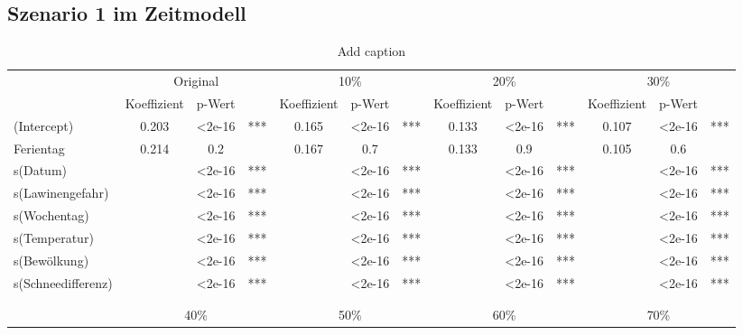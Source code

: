 \documentclass[12pt]{scrreprt}
\begin{document}
\subsection{Szenario 1 im Zeitmodell}
\begin{table}[htbp]
	\centering
	\caption{Add caption}
	\begin{adjustbox}{max width=\textwidth}
	\begin{tabular}{l|ccc|ccc|ccc|ccc|}
		\multicolumn{1}{r}{} & \multicolumn{3}{c}{Original} & \multicolumn{3}{c}{10\%} & \multicolumn{3}{c}{20\%} & \multicolumn{3}{c}{30\%} \\
		& Koeffizient & p-Wert &       & Koeffizient & p-Wert &       & Koeffizient & p-Wert &       & Koeffizient & p-Wert & \multicolumn{1}{c}{} \\
		\cmidrule{2-13}    (Intercept) & 0.203 & <2e-16 & ***   & 0.165 & <2e-16 & ***   & 0.133 & <2e-16 & ***   & 0.107 & <2e-16 & *** \\
		Ferientag & 0.214 & 0.2   &       & 0.167 & 0.7   &       & 0.133 & 0.9   &       & 0.105 & 0.6   &   \\
		s(Datum) &       & <2e-16 & ***   &       & <2e-16 & ***   &       & <2e-16 & ***   &       & <2e-16 & *** \\
		s(Lawinengefahr) &       & <2e-16 & ***   &       & <2e-16 & ***   &       & <2e-16 & ***   &       & <2e-16 & *** \\
		s(Wochentag) &       & <2e-16 & ***   &       & <2e-16 & ***   &       & <2e-16 & ***   &       & <2e-16 & *** \\
		s(Temperatur) &       & <2e-16 & ***   &       & <2e-16 & ***   &       & <2e-16 & ***   &       & <2e-16 & *** \\
		s(Bewölkung) &       & <2e-16 & ***   &       & <2e-16 & ***   &       & <2e-16 & ***   &       & <2e-16 & *** \\
		s(Schneedifferenz) &       & <2e-16 & ***   &       & <2e-16 & ***   &       & <2e-16 & ***   &       & <2e-16 & *** \\
		\cmidrule{2-13}    \multicolumn{1}{r}{} &       &       & \multicolumn{1}{c}{} &       &       & \multicolumn{1}{c}{} &       &       & \multicolumn{1}{c}{} &       &       & \multicolumn{1}{c}{} \\
		\multicolumn{1}{r}{} &       &       & \multicolumn{1}{c}{} &       &       & \multicolumn{1}{c}{} &       &       & \multicolumn{1}{c}{} &       &       & \multicolumn{1}{c}{} \\
		\multicolumn{1}{r}{} & \multicolumn{3}{c}{40\%} & \multicolumn{3}{c}{50\%} & \multicolumn{3}{c}{60\%} & \multicolumn{3}{c}{70\%} \\

\end{tabular}
\end{adjustbox}
\end{table}
\end{document}
